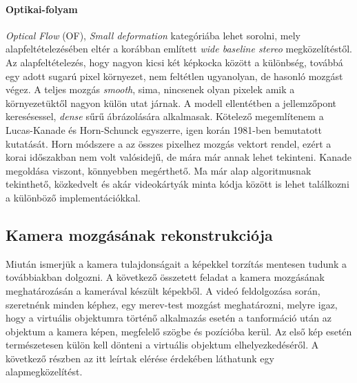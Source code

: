 \documentclass[12pt,a4paper,oneside]{report} %
\begin{document}
\paragraph{Optikai-folyam}
\textit{Optical Flow} (OF), \textit{Small deformation} kategóriába lehet sorolni, mely alapfeltételezésében eltér a korábban említett \textit{wide baseline stereo} megközelítéstől. Az alapfeltételezés, hogy nagyon kicsi két képkocka között a különbség, továbbá egy adott sugarú pixel környezet, nem feltétlen ugyanolyan, de hasonló  mozgást végez. A teljes mozgás \textit{smooth}, sima, nincsenek olyan pixelek amik a környezetüktől nagyon külön utat járnak.  A modell ellentétben a jellemzőpont keresésessel,  \textit{dense} sűrű ábrázolására alkalmasak. Kötelező megemlítenem a Lucas-Kanade \cite{lucas1981iterative} és Horn-Schunck \cite{horn1981determining} egyszerre, igen korán 1981-ben bemutatott kutatását. Horn módszere a az összes pixelhez  mozgás vektort rendel, ezért a korai időszakban nem volt valósidejű, de mára már annak lehet tekinteni. Kanade megoldása viszont, könnyebben megérthető. Ma már alap algoritmusnak tekinthető, közkedvelt és akár videokártyák minta kódja között is lehet találkozni a különböző implementációkkal.


\subsection{Kamera mozgásának rekonstrukciója}
Miután ismerjük a kamera tulajdonságait a képekkel torzítás mentesen tudunk a továbbiakban dolgozni.
A következő összetett feladat a kamera mozgásának meghatározásán a kamerával készült képekből. A videó feldolgozása során, szeretnénk minden képhez, egy merev-test mozgást meghatározni, melyre igaz, hogy a virtuális objektumra történő alkalmazás esetén a tanformáció után az objektum a kamera képen, megfelelő szögbe és pozícióba kerül. Az első kép esetén természetesen külön kell dönteni a virtuális objektum elhelyezkedéséről. A következő részben az itt leírtak elérése érdekében láthatunk egy alapmegközelítést.
\end{document}
